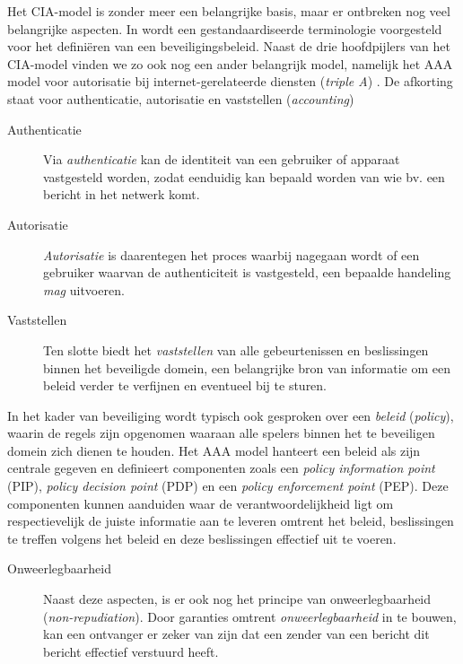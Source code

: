 Het CIA-model is zonder meer een belangrijke basis, maar er ontbreken nog veel
belangrijke aspecten. In \citep{rfc:3198} wordt een gestandaardiseerde
terminologie voorgesteld voor het defini\"eren van een beveiligingsbeleid.
Naast de drie hoofdpijlers van het CIA-model vinden we zo ook nog een ander
belangrijk model, namelijk het AAA model voor autorisatie bij
internet-gerelateerde diensten (\emph{triple A}) \citep{rfc:2904}. De afkorting
staat voor authenticatie, autorisatie en vaststellen (\emph{accounting})

\begin{description}

  \item[Authenticatie] Via \emph{authenticatie} kan de identiteit van een
  gebruiker of apparaat vastgesteld worden, zodat eenduidig kan bepaald worden
  van wie bv. een bericht in het netwerk komt.
  
  \item[Autorisatie] \emph{Autorisatie} is daarentegen het proces waarbij
  nagegaan wordt of een gebruiker waarvan de authenticiteit is vastgesteld, een
  bepaalde handeling \emph{mag} uitvoeren.
  
  \item[Vaststellen] Ten slotte biedt het \emph{vaststellen} van alle
  gebeurtenissen en beslissingen binnen het beveiligde domein, een belangrijke
  bron van informatie om een beleid verder te verfijnen en eventueel bij te
  sturen.

\end{description}

In het kader van beveiliging wordt typisch ook gesproken over een \emph{beleid}
(\emph{policy}), waarin de regels zijn opgenomen waaraan alle spelers binnen
het te beveiligen domein zich dienen te houden. Het AAA model hanteert een
beleid als zijn centrale gegeven en definieert componenten zoals een
\emph{policy information point} (PIP), \emph{policy decision point} (PDP) en
een \emph{policy enforcement point} (PEP). Deze componenten kunnen aanduiden
waar de verantwoordelijkheid ligt om respectievelijk de juiste informatie aan
te leveren omtrent het beleid, beslissingen te treffen volgens het beleid en
deze beslissingen effectief uit te voeren.

\begin{description}

  \item[Onweerlegbaarheid] Naast deze aspecten, is er ook nog het principe van
  onweerlegbaarheid (\emph{non-repudiation}). Door garanties omtrent
  \emph{onweerlegbaarheid} in te bouwen, kan een ontvanger er zeker van zijn
  dat een zender van een bericht dit bericht effectief verstuurd heeft.

\end{description}

